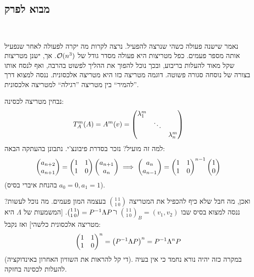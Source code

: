 \documentclass[name=רשימות אלגברה לינארית 2א]{../../../tex/classes/megasumPreamble}
\begin{document}
	
	
	\newpage
	\setcounter{tocdepth}{3} %
	\tableofcontents
	
	
	
	
	\section[לכסון]{}
	\subsection{מבוא לפרק}\ 
	
	נאמר שישנה פעולה כשהי שנרצה להפעיל. נרצה לקרות מה יקרה לפעולה לאחר שנפעיל אותה מספר פעמים. כפל מטריצות היא פעולה מסדר גודל של $\mathcal{O}(n^3)$. אך, ישנן מטריצות שקל מאוד להעלות בריבוע, ובכך נוכל להפוך את ההליך לפשוט בהרבה, ואף לנסח אותו בצורה של נוסחה סגורה פשוטה. דוגמה מטריצה כזו היא מטריצה אלכסונית. ננסה למצוא דרך ''להמיר`` בין מטריצה ''רגילה`` למטריצה אלכסונית. 
	
	נבחין מטריצה לכסינה: 
		\[ T_A^m(A) = A^m(v) = \begin{pmatrix} \lambda_1^m && \\ & \ddots & \\ &&\lambda_n^m \end{pmatrix} \]
	למה זה מועיל? נזכר בסדרת פיבונצ'י. נתבונן בהעתקה הבאה: 
	\[ \begin{pmatrix} a_{n + 2} \\ a_{n + 1} \end{pmatrix} = \begin{pmatrix} 1 & 1 \\ 1 & 0 \end{pmatrix}\begin{pmatrix} a_{n + 1} \\ a_n \end{pmatrix} \implies \begin{pmatrix} a_n \\ a_{n - 1} \end{pmatrix} = \begin{pmatrix} 1 & 1 \\ 1 & 0 \end{pmatrix}^{n - 1}\begin{pmatrix} 1 \\ 0 \end{pmatrix} \]
	(בהנחת איברי בסיס $a_0 = 0, a_1 = 1$). 
	
	ואכן, מה חבל שלא כיף להכפיל את המטריצה $\binom{1\,1}{1\,0}$ בעצמה המון פעמים. מה נוכל לעשות? ננסה למצוא בסיס שבו $\binom{1 \, 1}{1\, 0}_B = (v_1, v_2)$ ו־$\binom{1 \, 1}{1 \, 0} = P^{-1} \Lambda P$. [המשמעות של $\Lambda$ היא מטריצה אלכסונית כלשהי] ואז נקבל: 
	\[ \begin{pmatrix} 1 & 1 \\ 1 & 0 \end{pmatrix}^{n} = \left ( P^{-1} \Lambda P \right )^{n} = P^{-1}\Lambda^nP \]
	(די קל להראות את השוויון האחרון באינדוקציה). במקרה כזה יהיה נורא נחמד כי אין בעיה להעלות לכסינה בחזקה. 
	
\end{document}
